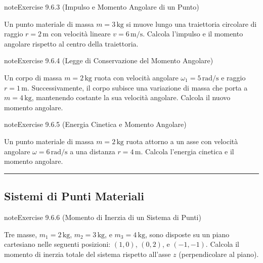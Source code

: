 \documentclass[letterpaper,10pt,italian]{jupyterBook}
\begin{document}
\begin{sphinxadmonition}{note}{Exercise 9.6.3 (Impulso e Momento Angolare di un Punto)}



\sphinxAtStartPar
Un punto materiale di massa \(m = 3 \, \text{kg}\) si muove lungo una traiettoria circolare di raggio \(r = 2 \, \text{m}\) con velocità lineare \(v = 6 \, \text{m/s}\). Calcola l’impulso e il momento angolare rispetto al centro della traiettoria.
\end{sphinxadmonition}
 \label{exercise:ch/mechanics/inertia-problems-exercise-3}

\begin{sphinxadmonition}{note}{Exercise 9.6.4 (Legge di Conservazione del Momento Angolare)}



\sphinxAtStartPar
Un corpo di massa \(m = 2 \, \text{kg}\) ruota con velocità angolare \(\omega_1 = 5 \, \text{rad/s}\) e raggio \(r = 1 \, \text{m}\). Successivamente, il corpo subisce una variazione di massa che porta a \(m = 4 \, \text{kg}\), mantenendo costante la sua velocità angolare. Calcola il nuovo momento angolare.
\end{sphinxadmonition}
 \label{exercise:ch/mechanics/inertia-problems-exercise-4}

\begin{sphinxadmonition}{note}{Exercise 9.6.5 (Energia Cinetica e Momento Angolare)}



\sphinxAtStartPar
Un punto materiale di massa \(m = 2 \, \text{kg}\) ruota attorno a un asse con velocità angolare \(\omega = 6 \, \text{rad/s}\) a una distanza \(r = 4 \, \text{m}\). Calcola l’energia cinetica e il momento angolare.
\end{sphinxadmonition}


\bigskip\hrule\bigskip



\subsection{Sistemi di Punti Materiali}
\label{\detokenize{ch/mechanics/inertia-problems:sistemi-di-punti-materiali}} \label{exercise:ch/mechanics/inertia-problems-exercise-5}

\begin{sphinxadmonition}{note}{Exercise 9.6.6 (Momento di Inerzia di un Sistema di Punti)}



\sphinxAtStartPar
Tre masse, \(m_1 = 2 \, \text{kg}\), \(m_2 = 3 \, \text{kg}\), e \(m_3 = 4 \, \text{kg}\), sono disposte su un piano cartesiano nelle seguenti posizioni: \((1, 0)\), \((0, 2)\), e \((-1, -1)\). Calcola il momento di inerzia totale del sistema rispetto all’asse \(z\) (perpendicolare al piano).
\end{sphinxadmonition}
 \label{exercise:ch/mechanics/inertia-problems-exercise-6}
\end{document}
